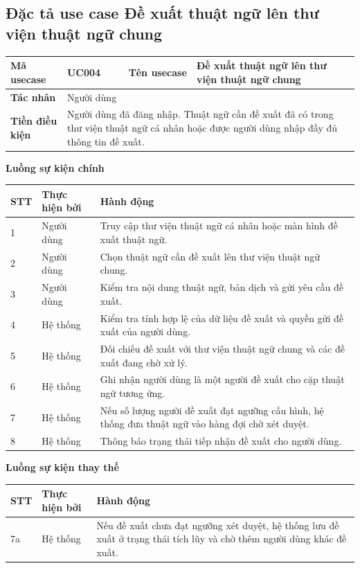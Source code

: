 \documentclass[../DoAn.tex]{subfiles}
\begin{document}
\subsection{Đặc tả use case Đề xuất thuật ngữ lên thư viện thuật ngữ chung}

\begin{longtable}{|p{3cm}|p{4cm}|p{3cm}|p{4.5cm}|}
\hline
\textbf{Mã usecase} & UC004 & \textbf{Tên usecase} & Đề xuất thuật ngữ lên thư viện thuật ngữ chung \\ \hline
\textbf{Tác nhân} & Người dùng & & \\ \hline
\textbf{Tiền điều kiện} & \multicolumn{3}{p{11.5cm}|}{Người dùng đã đăng nhập. Thuật ngữ cần đề xuất đã có trong thư viện thuật ngữ cá nhân hoặc được người dùng nhập đầy đủ thông tin đề xuất.} \\ \hline
\end{longtable}

\textbf{Luồng sự kiện chính}

\begin{longtable}{|p{1cm}|p{3.3cm}|p{10.2cm}|}
\hline
\textbf{STT} & \textbf{Thực hiện bởi} & \textbf{Hành động} \\ \hline
1 & Người dùng & Truy cập thư viện thuật ngữ cá nhân hoặc màn hình đề xuất thuật ngữ. \\ \hline
2 & Người dùng & Chọn thuật ngữ cần đề xuất lên thư viện thuật ngữ chung. \\ \hline
3 & Người dùng & Kiểm tra nội dung thuật ngữ, bản dịch và gửi yêu cầu đề xuất. \\ \hline
4 & Hệ thống & Kiểm tra tính hợp lệ của dữ liệu đề xuất và quyền gửi đề xuất của người dùng. \\ \hline
5 & Hệ thống & Đối chiếu đề xuất với thư viện thuật ngữ chung và các đề xuất đang chờ xử lý. \\ \hline
6 & Hệ thống & Ghi nhận người dùng là một người đề xuất cho cặp thuật ngữ tương ứng. \\ \hline
7 & Hệ thống & Nếu số lượng người đề xuất đạt ngưỡng cấu hình, hệ thống đưa thuật ngữ vào hàng đợi chờ xét duyệt. \\ \hline
8 & Hệ thống & Thông báo trạng thái tiếp nhận đề xuất cho người dùng. \\ \hline
\end{longtable}

\textbf{Luồng sự kiện thay thế}

\begin{longtable}{|p{1cm}|p{3.3cm}|p{10.2cm}|}
\hline
\textbf{STT} & \textbf{Thực hiện bởi} & \textbf{Hành động} \\ \hline

7a & Hệ thống & Nếu đề xuất chưa đạt ngưỡng xét duyệt, hệ thống lưu đề xuất ở trạng thái tích lũy và chờ thêm người dùng khác đề xuất. \\ \hline
\end{longtable}
\end{document}
